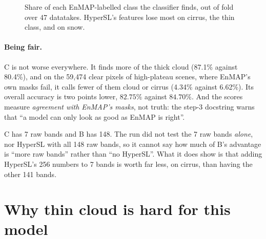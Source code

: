 \begin{figure}[htbp]
\centering
{}
\caption{Share of each EnMAP-labelled class the classifier finds, out of fold over 47 datatakes. HyperSL's features lose
most on cirrus, the thin class, and on snow.}
\label{fig:hslcloud:recall}
\end{figure}

\paragraph{Being fair.} C is not worse everywhere. It finds more of the thick cloud (87.1\% against 80.4\%), and on the
59,474 clear pixels of high-plateau scenes, where EnMAP's own masks fail, it calls fewer of them cloud or cirrus (4.34\%
against 6.62\%). Its overall accuracy is two points lower, $82.75\%$ against $84.70\%$\tagC. And the scores measure
\emph{agreement with EnMAP's masks}, not truth: the step-3 docstring warns that ``a model can only look as good as EnMAP is
right''.

\begin{sourcenote}
C has 7 raw bands and B has 148. The run did not test the 7 raw bands \emph{alone}, nor HyperSL with all 148 raw bands, so
it cannot say how much of B's advantage is ``more raw bands'' rather than ``no HyperSL''. What it does show is that adding
HyperSL's 256 numbers to 7 bands is worth far less, on cirrus, than having the other 141 bands.
\end{sourcenote}

\section{Why thin cloud is hard for this model}\label{sec:hslcloud:why}


